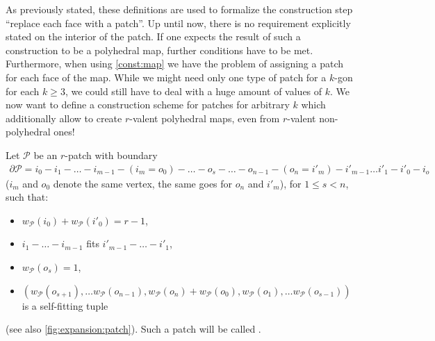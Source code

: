 \begin{construction}
\begin{cdescription}
  \end{cdescription}
\end{construction}

As previously stated, these definitions are used to formalize the construction step ``replace each face with a patch''. Up until now, there is no requirement explicitly stated on the interior of the patch. If one expects the result of such a construction to be a polyhedral map, further conditions have to be met. Furthermore, when using \autoref{const:map} we have the problem of assigning a patch for each face of the map. While we might need only one type of patch for a $k$-gon for each $k \geq 3$, we could still have to deal with a huge amount of values of $k$. We now want to define a construction scheme for patches for arbitrary $k$ which additionally allow to create $r$-valent polyhedral maps, even from $r$-valent non-polyhedral ones!

\begin{definition}\label{def:expansion:patch} Let $\mathcal{P}$ be an $r$-patch with boundary
\begin{align*}
  \partial\mathcal{P} = i_0 - i_1 - \dots - i_{m-1} - (i_m = o_0) - \dots - o_s - \dots - o_{n - 1} - (o_n = i'_m) - i'_{m-1} \dots i'_1 - i'_0 - i_o
\end{align*}
($i_m$ and $o_0$ denote the same vertex, the same goes for $o_n$ and $i'_m$), for $1 \leq s < n$, such that:
  \begin{itemize}
  \item $w_{\mathcal{P}}(i_0) + w_{\mathcal{P}}(i'_0) = r - 1$,
  \item $i_1 - \dots - i_{m-1}$ fits $i'_{m-1} - \dots - i'_1$,
  \item $w_{\mathcal{P}}(o_s) = 1$,
  \item $(w_{\mathcal{P}}(o_{s + 1}), \dots w_{\mathcal{P}}(o_{n - 1}), w_{\mathcal{P}}(o_n) + w_{\mathcal{P}}(o_0), w_{\mathcal{P}}(o_1), \dots w_{\mathcal{P}}(o_{s - 1}))$ is a self-fitting tuple
  \end{itemize}
  (see also \autoref{fig:expansion:patch}). Such a patch will be called .
\end{definition}


